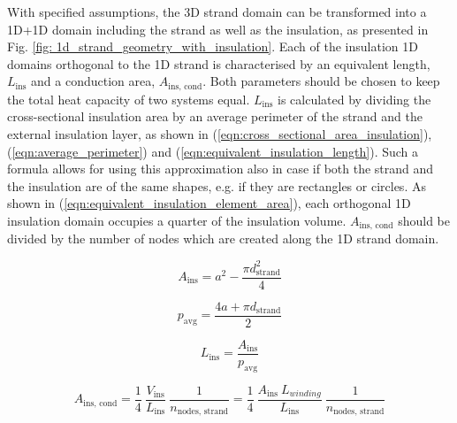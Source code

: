 With specified assumptions, the 3D strand domain can be transformed into a 1D+1D domain including the strand as well as the insulation, as presented in Fig. \ref{fig: 1d_strand_geometry_with_insulation}. Each of the insulation 1D domains orthogonal to the 1D strand is characterised by an equivalent length, $L_\text{ins}$ and a conduction area, $A_\text{ins, cond}$. Both parameters should be chosen to keep the total heat capacity of two systems equal. $L_\text{ins}$ is calculated by dividing the cross-sectional insulation area by an average perimeter of the strand and the external insulation layer, as shown in (\ref{eqn:cross_sectional_area_insulation}), (\ref{eqn:average_perimeter}) and (\ref{eqn:equivalent_insulation_length}). Such a formula allows for using this approximation also in case if both the strand and the insulation are of the same shapes, e.g. if they are rectangles or circles. As shown in (\ref{eqn:equivalent_insulation_element_area}), each orthogonal 1D insulation domain occupies a quarter of the insulation volume. $A_\text{ins, cond}$ should be divided by the number of nodes which are created along the 1D strand domain.

\begin{equation}
    A_\text{ins} = a^2 - \frac{\pi d_\text{strand}^2}{4}
    \label{eqn:cross_sectional_area_insulation}
\end{equation}

\begin{equation}
    p_\text{avg} = \frac{4 a + \pi d_\text{strand}}{2} 
    \label{eqn:average_perimeter}
\end{equation}

\begin{equation}
    L_\text{ins} = \frac{A_\text{ins}}{p_\text{avg}}
    \label{eqn:equivalent_insulation_length}
\end{equation}

\begin{equation}
    A_\text{ins, cond} = \frac{1}{4}~\frac{ V_\text{ins}}{L_\text{ins}}~\frac{1}{n_\text{nodes, strand}}= \frac{1}{4}~\frac{ A_\text{ins} ~ L_{winding}}{L_\text{ins}}~\frac{1}{n_\text{nodes, strand}}
    \label{eqn:equivalent_insulation_element_area}
\end{equation}

